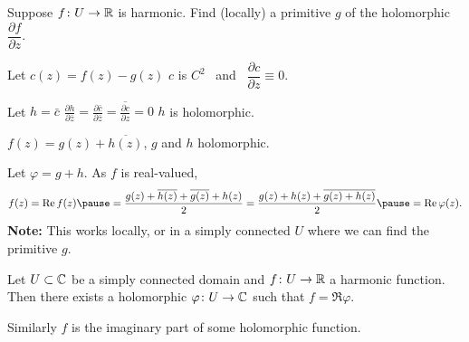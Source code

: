 \documentclass[10pt,aspectratio=169]{beamer}
\begin{document}
\begin{frame}
Suppose $f \colon U \to {\mathbb{R}}$ is harmonic.
\quad
\pause
Find (locally) a primitive $g$ of the holomorphic
$\dfrac{\partial f}{\partial z}$.

\pause

Let $c(z) = f(z)-g(z)$
\wthus
$c$ is $C^2$ ~and~ $\dfrac{\partial c}{\partial z} \equiv 0$.

\medskip
\pause

Let $h = \bar{c}$
\pause
\wthus
$\displaystyle
\frac{\partial h}{\partial \bar{z}}
=
\frac{\partial \bar{c}}{\partial \bar{z}}
=
\overline{
\frac{\partial c}{\partial z}
}
=
0$
\pause
\wthus
$h$ is holomorphic.

\pause
\medskip
\thus \quad
$f(z) = g(z) + \overline{h(z)}$,
\quad
$g$ and $h$ holomorphic.

\medskip
\pause

Let $\varphi = g+h$.
\pause  \quad As $f$ is real-valued,
\[
f(z) = \Re f(z)
\pause
=
\frac{g(z) + \overline{h(z)} + \overline{g(z)}+h(z)}{2}
=
\frac{g(z) + h(z) + \overline{g(z)+h(z)}}{2}
\pause
=
\Re \varphi(z) .
\]
\pause
\textbf{Note:} This works locally, or in a simply
connected $U$ where we can find the primitive $g$.

\pause

\begin{proposition}
Let $U \subset {\mathbb{C}}$ be a simply connected domain and $f \colon U \to {\mathbb{R}}$ a
harmonic function.  Then there exists a holomorphic $\varphi \colon
U \to {\mathbb{C}}$ such that $f = \Re \varphi$.
\end{proposition}

\pause

Similarly $f$ is the imaginary part of some holomorphic function.

\end{frame}
\end{document}

